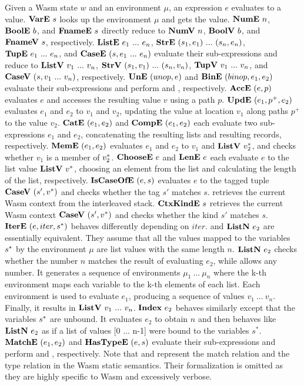 Given a Wasm state $w$ and an environment $\mu$, an expression $e$ evaluates
to a value.
$\textbf{VarE} ~ s${} looks up the environment $\mu$ and gets the value.
$\textbf{NumE} ~ n${}, $\textbf{BoolE} ~ b${}, and $\textbf{FnameE} ~ s${} directly reduce to $\textbf{NumV} ~
n${}, $\textbf{BoolV} ~ b${}, and $\textbf{FnameV} ~ s${}, respectively.
$\textbf{ListE} ~ e_1 ~ ... ~ e_n${}, $\textbf{StrE} ~ (s_1, e_1) ~ ... ~ (s_n, e_n)${}, $\textbf{TupE}
~ e_1 ~ ... ~ e_n${}, and $\textbf{CaseE} ~ (s, e_1 ~ ... ~ e_n)${} evaluate their
sub-expressions and reduce to $\textbf{ListV} ~ v_1 ~ ... ~ v_n${}, $\textbf{StrV} ~ (s_1, v_1)
~ ... ~ (s_n, v_n)${}, $\textbf{TupV} ~ v_1 ~ ... ~ v_n${}, and $\textbf{CaseV} ~ (s, v_1 ~ ...
~ v_n)${}, respectively.
$\textbf{UnE} ~ (unop, e)${} and $\textbf{BinE} ~ (binop, e_1, e_2)${} evaluate their
sub-expressions and perform \unop{} and \binop{}, respectively.
$\textbf{AccE} ~ (e, p)${} evaluates $e$ and accesses the resulting value $v$ using a
path $p$.
$\textbf{UpdE} ~ (e_1, p^+, e_2)${} evaluates $e_1$ and $e_2$ to $v_1$ and $v_2$,
updating the value at location $v_1$ along paths $p^+$ to the value $v_2$.
$\textbf{CatE} ~ (e_1, e_2)${} and $\textbf{CompE} ~ (e_1, e_2)${} each evaluate two
sub-expressions $e_1$ and $e_2$, concatenating the resulting lists and
resulting records, respectively.
$\textbf{MemE} ~ (e_1, e_2)${} evaluates $e_1$ and $e_2$ to $v_1$ and $\textbf{ListV} ~ v^*_2$, and checks whether $v_1$ is a member of $v^*_2$.
$\textbf{ChooseE} ~ e$ and $\textbf{LenE} ~ e${} each evaluate $e$ to the list value $\textbf{ListV} ~
v^*$, choosing an element from the list and calculating the length of the
list, respectively.
$\textbf{IsCaseOfE} ~ (e, s)${} evaluates $e$ to the tagged tuple $\textbf{CaseV} ~ (s', v^*)$ and checks whether the tag $s'$ matches $s$.
\getcurctxe{} retrieves the current Wasm context from the interleaved stack.
$\textbf{CtxKindE} ~ s${} retrieves the current Wasm context $\textbf{CaseV} ~ (s', v^*)$
and checks whether the kind $s'$ matches $s$.
$\textbf{IterE} ~ (e, iter, s^*)${} behaves differently depending on $iter$.
\listiter{} and $\textbf{ListN} ~ e_2${} are essentially equivalent.
They assume that all the values mapped to the variables $s^*$ by the
environment $\mu${} are list values with the same length $n$.
$\textbf{ListN} ~ e_2${} checks whether the number $n$ matches the result of
evaluating $e_2$, while \listiter{} allows any number.
It generates a sequence of environments $\mu_1 ~ ... ~ \mu_n$ where the k-th
environment maps each variable to the k-th elements of each list.
Each environment is used to evaluate $e_1$, producing a sequence of values $v_1
~ ... ~ v_n$.
Finally, it results in $\textbf{ListV} ~ v_1 ~ ... ~ v_n$.
$\textbf{Index} ~ e_2${} behaves similarly except that the variables $s^*$ are
unbound.
It evaluates $e_2$ to obtain $n$ and then behaves like $\textbf{ListN} ~ e_2${} as
if a list of values [0 ... n-1] were bound to the variables $s^*$.
$\textbf{MatchE} ~ (e_1, e_2)${} and $\textbf{HasTypeE} ~ (e, s)${} evaluate their
sub-expressions and perform \match{} and \hastype{}, respectively.
Note that \match{} and \hastype{} represent the match relation and the type
relation in the Wasm static semantics.
Their formalization is omitted as they are highly specific to Wasm and
excessively verbose.




